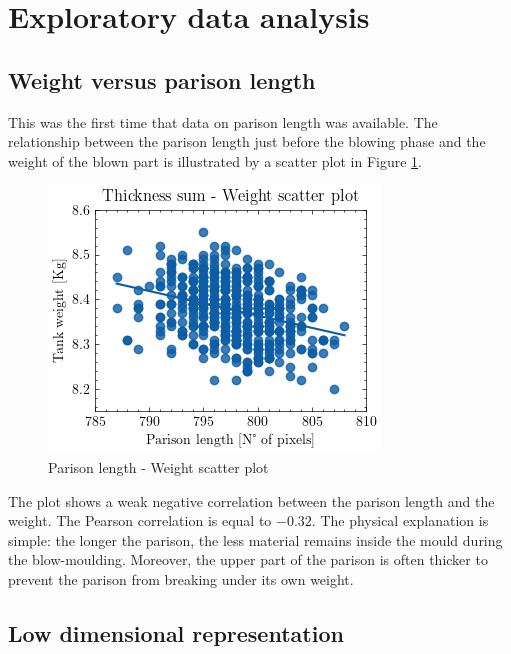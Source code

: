 %

\section{Exploratory data analysis}

\subsection{Weight versus parison length}

This was the first time that data on parison length was available. The relationship between the parison length just before the blowing phase and the weight of the blown part is illustrated by a scatter plot in Figure \ref{fig:length_weight_scatter}.
%
\begin{figure}
\centerline{\includegraphics[scale=1.2]{images/chapter_3/length_weight_scatter.png}}
\caption{Parison length - Weight scatter plot}
\label{fig:length_weight_scatter}
\end{figure}
%
The plot shows a weak negative correlation between the parison length and the weight. The Pearson correlation is equal to $-0.32$. The physical explanation is simple: the longer the parison, the less material remains inside the mould during the blow-moulding. Moreover, the upper part of the parison is often thicker to prevent the parison from breaking under its own weight.  

\subsection{Low dimensional representation} \label{Principal Component Analysis for data exploration}

